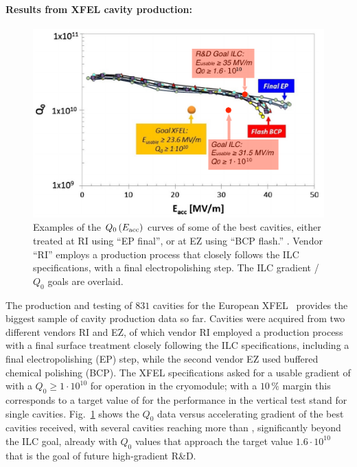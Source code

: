 \paragraph{Results from XFEL cavity production:}

\begin{figure}[htbp]
   \includegraphics[width=\hsize]{chapters/figures/prab-19-092001-fig19-mod}
\caption{Examples of the $Q_0\,(E_{\mathrm{acc}})$ curves of some of the best
cavities, either treated at RI using ``EP final'', or at EZ using
``BCP flash.''
\cite[Fig. 19]{Singer:2016fbf}. 
Vendor ``RI'' employs a production process that closely follows the ILC specifications, with a final electropolishing step.
The ILC gradient / $Q_0$ goals are overlaid.}
\label{fig:cavity-gradient}
\end{figure}

The production and testing of $831$ cavities for the European XFEL~\cite{Singer:2016fbf,Reschke:2017gjp} provides the biggest sample of cavity production data so far. 
Cavities were acquired from two different vendors RI and EZ,
of which vendor RI employed a production process with a final surface treatment closely following the ILC specifications, including a final electropolishing (EP) step,
while the second vendor EZ used buffered chemical polishing (BCP).
The XFEL specifications asked for a usable gradient of  with a $Q_0 \ge 1  \cdot 10^{10}$ for operation in the cryomodule;
with a $10\,\%$ margin this corresponds to a target value of  for the performance in the vertical test stand for single cavities.
Fig.~\ref{fig:cavity-gradient} shows the $Q_0$ data versus accelerating gradient of the best cavities received, with several cavities reaching more than , significantly beyond the ILC goal, already with $Q_0$ values that approach the target value $1.6\cdot10^{10}$ that is the goal of future high-gradient R\&D.

